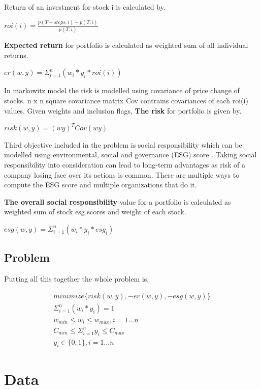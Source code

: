 \documentclass[11pt]{article} %
\begin{document}
Return of an investment for stock i is calculated by.

$roi(i) = \frac{p(T+steps,i) - p(T,i)}{p(T,i)}$

\textbf{Expected return} for portfolio is calculated as weighted sum of all individual returns.

$er(w,y) = \Sigma_{i=1}^{n} (w_i * y_i * roi(i))$

In markowitz model the risk is modelled using covariance of price change of stocks. n x n square covariance matrix Cov contrains covariances of each roi(i) values. Given weights and inclusion flags, \textbf{The risk} for portfolio is given by.

$risk(w,y) = (w y)^T Cov (w y)$

Third objective included in the problem is social responsibility which can be modelled using environmental, social and governance (ESG) score \cite{chen2021social}. Taking social responsibility into consideration can lead to long-term advantages as risk of a company losing face over its actions is common. There are multiple ways to compute the ESG score and multiple organizations that do it. 

\textbf{The overall social responsibility} value for a portfolio is calculated as weighted sum of stock esg scores and weight of each stock.

$esg(w,y) = \Sigma_{i=1}^n (w_i * y_i * esg_i)$



\subsection{Problem}

Putting all this together the whole problem is.

\begin{equation}
\begin{split}
minimize \{ risk(w,y), -er(w,y), -esg(w,y) \}\\
\Sigma_{i=1}^n (w_i * y_i) = 1\\
w_{min} \leq w_i \leq w_{max}, i = 1...n\\
C_{min} \leq \Sigma_{i=1}^n y_i \leq C_{max}\\
y_i \in \{0,1\}, i = 1...n\
\end{split}
\end{equation}

\section{Data}
\end{document}
